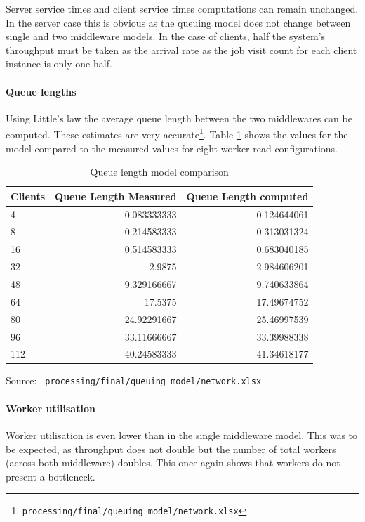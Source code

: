 \documentclass[11pt,a4paper]{article}
\newcommand{\source}[1]{\vspace{-1em}\caption*{\tiny{Source: \texttt{ {#1} }}} }
\begin{document}
Server service times and client service times computations can remain unchanged. In the server case this is obvious as the queuing model does not change between single and two middleware models. In the case of clients, half the system's throughput must be taken as the arrival rate as the job visit count for each client instance is only one half.

\paragraph{Queue lengths}
Using Little's law the average queue length between the two middlewares can be computed. These estimates are very accurate\footnote{\label{source::q_network}\texttt{processing/final/queuing_model/network.xlsx}}. Table \ref{talbe::ql_comparison} shows the values for the model compared to the measured values for eight worker read configurations.
\begin{table}
    \centering
    \begin{tabular}{|l|r|r|}
        \hline\multicolumn{1}{|c|}{\textbf{Clients}} & \multicolumn{1}{|c|}{\textbf{Queue Length Measured}} & \multicolumn{1}{|c|}{\textbf{Queue Length computed}} \\
        \hline\hline 4 & 0.083333333 & 0.124644061 \\
        \hline 8 & 0.214583333 & 0.313031324 \\
        \hline 16 & 0.514583333 & 0.683040185 \\
        \hline 32 & 2.9875 & 2.984606201 \\
        \hline 48 & 9.329166667 & 9.740633864 \\
        \hline 64 & 17.5375 & 17.49674752 \\
        \hline 80 & 24.92291667 & 25.46997539 \\
        \hline 96 & 33.11666667 & 33.39988338 \\
        \hline 112 & 40.24583333 & 41.34618177 \\
        \hline
    \end{tabular}
    \caption{Queue length model comparison}
    \source{processing/final/queuing\_model/network.xlsx}
    \label{talbe::ql_comparison}
\end{table}

\paragraph{Worker utilisation}
Worker utilisation is even lower than in the single middleware model. This was to be expected, as throughput does not double but the number of total workers (across both middleware) doubles. This once again shows that workers do not present a bottleneck.
\end{document}
